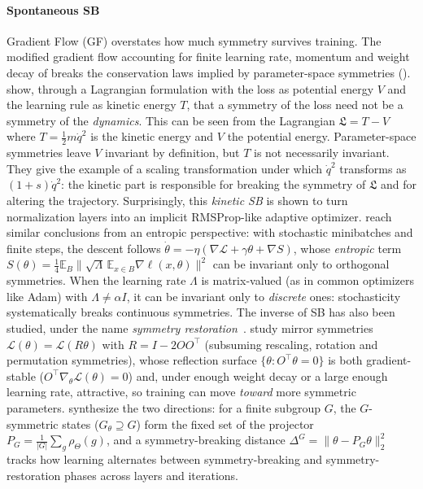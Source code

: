 \documentclass[mathematics,review,submit,moreauthors]{Definitions/mdpi}
\begin{document}
\paragraph{Spontaneous SB}
Gradient Flow (GF) overstates how much symmetry survives training.
The modified gradient flow accounting for finite learning rate, momentum and weight decay of \citet{kunin2020} breaks the conservation laws implied by parameter-space symmetries ().
\citet{tanaka2021} show, through a Lagrangian formulation with the loss as potential energy $V$ and the learning rule as kinetic energy $T$, that a symmetry of the loss need not be a symmetry of the \emph{dynamics}.
This can be seen from the Lagrangian $\mathfrak L = T-V$ where $T=\frac{1}{2} m \dot q^2$ is the kinetic energy and $V$ the potential energy.
Parameter-space symmetries leave $V$ invariant by definition, but $T$ is not necessarily invariant.
They give the example of a scaling transformation under which $\dot q^2$ transforms as $(1+s)\dot q^2$: the kinetic part is responsible for breaking the symmetry of $\mathfrak L$ and for altering the trajectory.
Surprisingly, this \emph{kinetic SB} is shown to turn normalization layers into an implicit RMSProp-like adaptive optimizer.
\citet{ziyin2025a} reach similar conclusions from an entropic perspective: with stochastic minibatches and finite steps, the descent follows $\dot\theta=-\eta(\nabla \mathcal{L}+\gamma\theta+\nabla S)$, whose \emph{entropic} term $S(\theta)=\tfrac14\mathbb{E}_B\|\sqrt{\Lambda}\,\mathbb{E}_{x\in B}\nabla \ell(x,\theta)\|^2$ can be invariant only to orthogonal symmetries.
When the learning rate $\Lambda$ is matrix-valued (as in common optimizers like Adam) with $\Lambda\neq\alpha I$, it can be invariant only to \emph{discrete} ones: stochasticity systematically breaks continuous symmetries.
The inverse of SB has also been studied, under the name \emph{symmetry restoration}~\citep{ziyin2025}.
\citet{ziyin2024} study mirror symmetries $\mathcal{L}(\theta)=\mathcal{L}(R\theta)$ with $R=I-2OO^\top$ (subsuming rescaling, rotation and permutation symmetries), whose reflection surface $\{\theta:O^\top \theta=0\}$ is both gradient-stable ($O^\top\nabla_\theta \mathcal{L}(\theta)=0$) and, under enough weight decay or a large enough learning rate, attractive, so training can move \emph{toward} more symmetric parameters.
\citet{ziyin2025} synthesize the two directions: for a finite subgroup $G$, the $G$-symmetric states ($G_\theta\supseteq G$) form the fixed set of the projector $P_G=\frac{1}{|G|}\sum_g\rho_\Theta(g)$, and a symmetry-breaking distance $\Delta^G=\|\theta-P_G\theta\|_2^2$ tracks how learning alternates between symmetry-breaking \citep{ziyin2025a} and symmetry-restoration \citep{ziyin2024} phases across layers and iterations.
\end{document}
